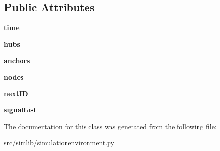 \subsection*{Public Attributes}
\begin{DoxyCompactItemize}
\item 
\mbox{\label{classsimlib_1_1simulationenvironment_1_1_simulation_environment_a81ac9426bfad791fb4a1ddaebace2545}} 
{\bfseries time}
\item 
\mbox{\label{classsimlib_1_1simulationenvironment_1_1_simulation_environment_a04ccb1a4630854739716f8a50d971ac6}} 
{\bfseries hubs}
\item 
\mbox{\label{classsimlib_1_1simulationenvironment_1_1_simulation_environment_a0f648c8fa4432c81ced68f989f1e56f0}} 
{\bfseries anchors}
\item 
\mbox{\label{classsimlib_1_1simulationenvironment_1_1_simulation_environment_a8aa2d5276df2d1b1c328d9adf9ad18af}} 
{\bfseries nodes}
\item 
\mbox{\label{classsimlib_1_1simulationenvironment_1_1_simulation_environment_aa4ded233ce51afb7b40a8cd62daa3ec7}} 
{\bfseries next\+ID}
\item 
\mbox{\label{classsimlib_1_1simulationenvironment_1_1_simulation_environment_a27aced3ffaa804598044e5f73475c63f}} 
{\bfseries signal\+List}
\end{DoxyCompactItemize}


The documentation for this class was generated from the following file\+:\begin{DoxyCompactItemize}
\item 
src/simlib/simulationenvironment.\+py\end{DoxyCompactItemize}
